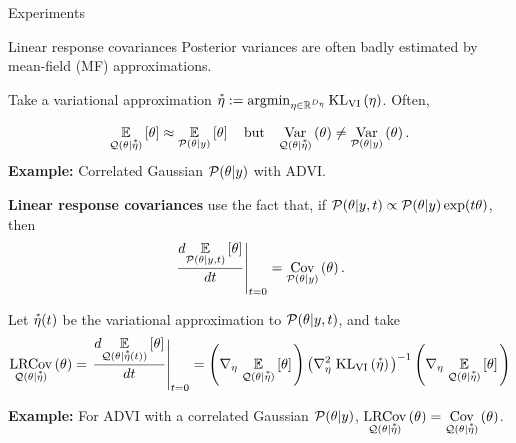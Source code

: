 \documentclass[8pt]{beamer}\usepackage[]{graphicx}\usepackage[]{color}
\begin{document}
\begin{frame}{Experiments}

\RuntimeARM{}

\end{frame}



\begin{frame}{Linear response covariances}
%
Posterior variances are often badly estimated by mean-field (MF) approximations.

Take a variational approximation 
$\accentset{*}{\eta} := \operatorname*{\mathrm{argmin}}_{\eta \in \mathbb{R}^{D_{\eta}}} \mathrm{KL}_{\mathrm{VI}}\left(\eta\right)$.  Often,

\begin{align}\label{eq:mfvb_conceit}
    \underset{\mathcal{Q}(\theta \vert \accentset{*}{\eta})}{\mathbb{E}}\left[\theta\right] \approx
    \underset{\mathcal{P}(\theta \vert y)}{\mathbb{E}}\left[\theta\right] \quad\textrm{but}\quad
    \underset{\mathcal{Q}(\theta \vert \accentset{*}{\eta})}{\mathrm{Var}}\left(\theta\right) \ne
    \underset{\mathcal{P}(\theta \vert y)}{\mathrm{Var}}\left(\theta\right).
\end{align}    
%
\textbf{Example: }Correlated Gaussian $\mathcal{P}(\theta \vert y)$ with ADVI.

\hrulefill

\textbf{Linear response covariances} use the fact that, if
$\mathcal{P}(\theta \vert y, t) \propto \mathcal{P}(\theta \vert y) \exp(t \theta)$, then
%
\begin{align}\label{eq:deriv_is_cov}
    \left. \frac{d \underset{\mathcal{P}(\theta \vert y, t)}{\mathbb{E}}\left[\theta\right]}{dt} \right|_{t=0} = \underset{\mathcal{P}(\theta \vert y)}{\mathrm{Cov}}\left(\theta\right).
\end{align}

Let $\accentset{*}{\eta}(t)$ be the variational approximation to $\mathcal{P}(\theta \vert y, t)$, and
take
%
\begin{align*}
    \underset{\mathcal{Q}(\theta \vert \accentset{*}{\eta})}{\mathrm{LRCov}}\left(\theta\right)
    =
    \left. \frac{d \underset{\mathcal{Q}(\theta \vert \accentset{*}{\eta}(t))}{\mathbb{E}}\left[\theta\right]}{dt} \right|_{t=0}
    =
    \left( \nabla_{\eta} \left. \underset{\mathcal{Q}(\theta \vert \accentset{*}{\eta})}{\mathbb{E}}\left[\theta\right] \right.\right)
    \left(\nabla^2_{\eta} \left. \mathrm{KL}_{\mathrm{VI}}\left(\accentset{*}{\eta}\right) \right. \right)^{-1}
    \left( \nabla_{\eta} \left. \underset{\mathcal{Q}(\theta \vert \accentset{*}{\eta})}{\mathbb{E}}\left[\theta\right] \right.\right)
\end{align*}
%

\textbf{Example: } For ADVI with a correlated Gaussian $\mathcal{P}(\theta \vert y)$,
$\underset{\mathcal{Q}(\theta \vert \accentset{*}{\eta})}{\mathrm{LRCov}}\left(\theta\right)  = \underset{\mathcal{Q}(\theta \vert \accentset{*}{\eta})}{\mathrm{Cov}}\left(\theta\right)$.


\end{frame}
\end{document}
